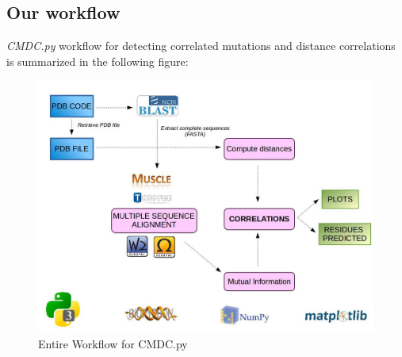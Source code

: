 \documentclass[12pt]{article}
\begin{document}
\subsection{Our workflow}
\textit{CMDC.py} workflow for detecting correlated mutations and distance correlations 
is summarized in the following figure:

\vspace{1cm}
\begin{figure}[h]
\centering
\includegraphics[scale=0.45]{workflow}
\caption{Entire Workflow for CMDC.py}
\label{fig:workflow}
\end{figure}
\end{document}

